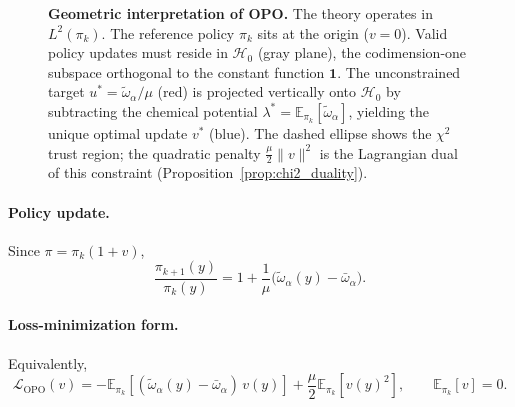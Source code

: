 \documentclass[11pt]{article}
\theoremstyle{definition}
\theoremstyle{remark}
\newcommand{\E}{\mathbb{E}}
\newcommand{\loss}{\mathcal{L}}
\newcommand{\pik}{\pi_k}
\begin{document}
\begin{figure}[htbp]

\caption{\textbf{Geometric interpretation of OPO.} The theory operates in $L^2(\pi_k)$. The reference policy $\pi_k$ sits at the origin ($v=0$). Valid policy updates must reside in $\mathcal{H}_0$ (gray plane), the codimension-one subspace orthogonal to the constant function $\mathbf{1}$. The unconstrained target $u^* = \tilde{\omega}_\alpha/\mu$ (red) is projected vertically onto $\mathcal{H}_0$ by subtracting the chemical potential $\lambda^* = \E_{\pik}[\tilde{\omega}_\alpha]$, yielding the unique optimal update $v^*$ (blue). The dashed ellipse shows the $\chi^2$ trust region; the quadratic penalty $\frac{\mu}{2}\|v\|^2$ is the Lagrangian dual of this constraint (Proposition~\ref{prop:chi2_duality}).}
\label{fig:opo_geometry}
\end{figure}

\paragraph{Policy update.}
Since $\pi=\pik(1+v)$,
\begin{equation}
\label{eq:policy_update}
\frac{\pi_{k+1}(y)}{\pik(y)}
=
1+\frac{1}{\mu}\Big(\tilde{\omega}_\alpha(y)-\bar{\omega}_\alpha\Big).
\end{equation}

\paragraph{Loss-minimization form.}
Equivalently,
\begin{equation}
\label{eq:opo_loss}
\boxed{
\loss_{\mathrm{OPO}}(v)
=
-\E_{\pik}[(\tilde{\omega}_\alpha(y) - \bar{\omega}_\alpha)\,v(y)]
+
\frac{\mu}{2}\E_{\pik}[v(y)^2],
\qquad \E_{\pik}[v]=0.
}
\end{equation}
\end{document}
